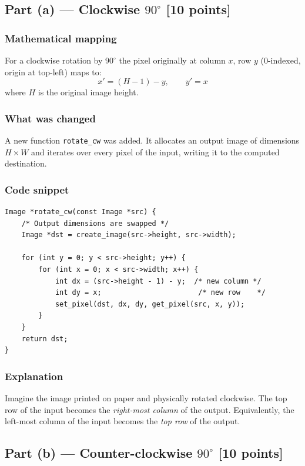 \documentclass[12pt,a4paper]{article}
\begin{document}
\subsection{Part (a) — Clockwise \texorpdfstring{$90^\circ$}{90 degrees} \textnormal{[10 points]}}

\subsubsection*{Mathematical mapping}
For a clockwise rotation by $90^\circ$ the pixel originally at column \(x\),
row \(y\) (0-indexed, origin at top-left) maps to:
\[
    x' = (H - 1) - y, \qquad y' = x
\]
where \(H\) is the original image height.

\subsubsection*{What was changed}
A new function \texttt{rotate\_cw} was added.
It allocates an output image of dimensions \(H \times W\) and iterates
over every pixel of the input, writing it to the computed destination.

\subsubsection*{Code snippet}

\begin{lstlisting}
Image *rotate_cw(const Image *src) {
    /* Output dimensions are swapped */
    Image *dst = create_image(src->height, src->width);

    for (int y = 0; y < src->height; y++) {
        for (int x = 0; x < src->width; x++) {
            int dx = (src->height - 1) - y;  /* new column */
            int dy = x;                       /* new row    */
            set_pixel(dst, dx, dy, get_pixel(src, x, y));
        }
    }
    return dst;
}
\end{lstlisting}

\subsubsection*{Explanation}
Imagine the image printed on paper and physically rotated clockwise.
The top row of the input becomes the \emph{right-most column} of the output.
Equivalently, the left-most column of the input becomes the \emph{top row} of
the output.

\subsection{Part (b) — Counter-clockwise \texorpdfstring{$90^\circ$}{90 degrees} \textnormal{[10 points]}}
\end{document}
